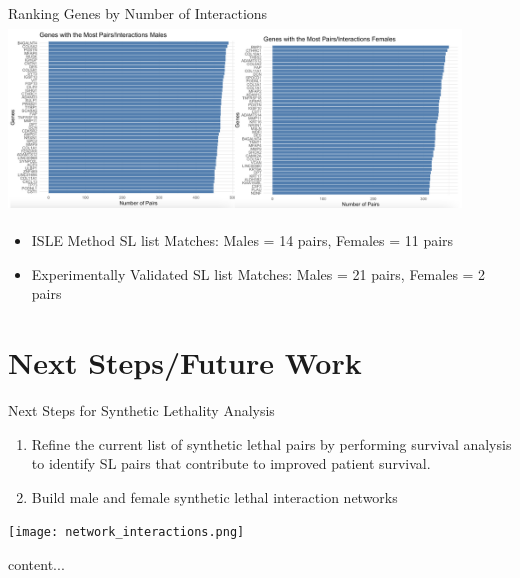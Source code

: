 \documentclass{beamer}
\begin{document}
	\begin{frame}{Ranking Genes by Number of Interactions}
		\includegraphics[width=12cm, height=5cm]{interactions.png}
		
		\begin{itemize}
		\item ISLE Method SL list Matches: Males = 14 pairs, Females = 11 pairs
		\item Experimentally Validated SL list Matches: Males = 21 pairs, Females = 2 pairs
		\end{itemize}
	\end{frame}

	\section{Next Steps/Future Work}
	\begin{frame}{Next Steps for Synthetic Lethality Analysis}
		\begin{enumerate}
			\item Refine the current list of synthetic lethal pairs by performing survival analysis to identify SL pairs that contribute to improved patient survival.
			\item Build male and female synthetic lethal interaction networks	
		\end{enumerate}
	\texttt{[image: network\_interactions.png]}\vspace{-1cm}
	\end{frame}

	\begin{frame}{}
		content...
	\end{frame}


	
\end{document}
